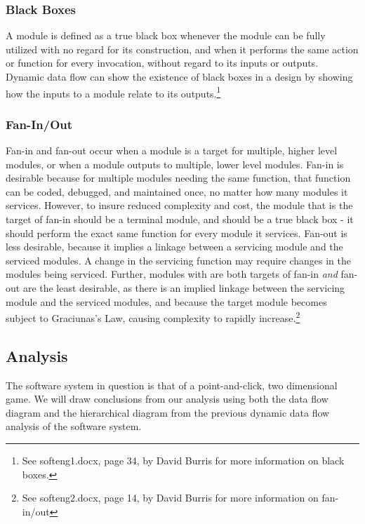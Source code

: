 \documentclass{article}
\begin{document}
		\subsubsection{Black Boxes}
			A module is defined as a true black box whenever the module can be fully utilized with no regard for its construction, and when it performs the same action or function for every invocation, without regard to its inputs or outputs. Dynamic data flow can show the existence of black boxes in a design by showing how the inputs to a module relate to its outputs.\footnote{See softeng1.docx, page 34, by David Burris for more information on black boxes.} 
		\subsubsection{Fan-In/Out}
			Fan-in and fan-out occur when a module is a target for multiple, higher level modules, or when a module outputs to multiple, lower level modules. Fan-in is desirable because for multiple modules needing the same function, that function can be coded, debugged, and maintained once, no matter how many modules it services. However, to insure reduced complexity and cost, the module that is the target of fan-in should be a terminal module, and should be a true black box - it should perform the exact same function for every module it services. Fan-out is less desirable, because it implies a linkage between a servicing module and the serviced modules. A change in the servicing function may require changes in the modules being serviced. Further, modules with are both targets of fan-in \emph{and} fan-out are the least desirable, as there is an implied linkage between the servicing module and the serviced modules, and because the target module becomes subject to Graciunas's Law, causing complexity to rapidly increase.\footnote{See softeng2.docx, page 14, by David Burris for more information on fan-in/out} 
	\subsection{Analysis}
		The software system in question is that of a point-and-click, two dimensional game. We will draw conclusions from our analysis using both the data flow diagram and the hierarchical diagram from the previous dynamic data flow analysis of the software system. 
\end{document}
